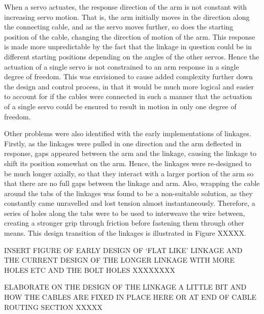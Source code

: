 \documentclass[11pt]{article}
\begin{document}
When a servo actuates, the response direction of the arm is not constant with increasing servo motion. That is, the arm initially moves in the direction along the connecting cable, and as the servo moves further, so does the starting position of the cable, changing the direction of motion of the arm. This response is made more unpredictable by the fact that the linkage in question could be in different starting positions depending on the angles of the other servos. Hence the actuation of a single servo is not constrained to an arm response in a single degree of freedom. This was envisioned to cause added complexity further down the design and control process, in that it would be much more logical and easier to account for if the cables were connected in such a manner that the actuation of a single servo could be ensured to result in motion in only one degree of freedom.

Other problems were also identified with the early implementations of linkages. Firstly, as the linkages were pulled in one direction and the arm deflected in response, gaps appeared between the arm and the linkage, causing the linkage to shift its position somewhat on the arm. Hence, the linkages were re-designed to be much longer axially, so that they interact with a larger portion of the arm so that there are no full gaps between the linkage and arm. Also, wrapping the cable around the tabs of the linkages was found to be a non-suitable solution, as they constantly came unravelled and lost tension almost instantaneously. Therefore, a series of holes along the tabs were to be used to interweave the wire between, creating a stronger grip through friction before fastening them through other means. This design transition of the linkages is illustrated in Figure XXXXX.

INSERT FIGURE OF EARLY DESIGN OF `FLAT LIKE' LINKAGE AND THE CURRENT DESIGN OF THE LONGER LINKAGE WITH MORE HOLES ETC AND THE BOLT HOLES XXXXXXXX

ELABORATE ON THE DESIGN OF THE LINKAGE A LITTLE BIT AND HOW THE CABLES ARE FIXED IN PLACE HERE OR AT END OF CABLE ROUTING SECTION XXXXX
\end{document}
